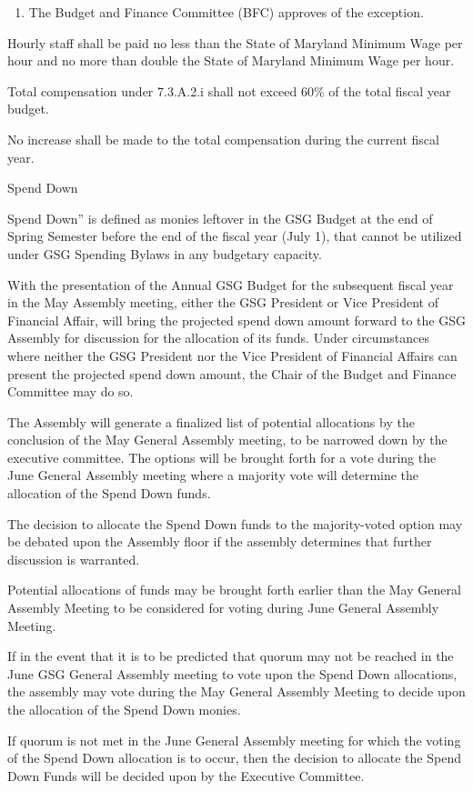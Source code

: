 \begin{bylaws-number}
\begin{bylaws-number}
\begin{enumerate}[i]
      \item The Budget and Finance Committee (BFC) approves of the exception.
    \end{enumerate}
    \item Hourly staff shall be paid no less than the State of Maryland Minimum Wage per hour and no more than double the State of Maryland Minimum Wage per hour.
    \item Total compensation under 7.3.A.2.i shall not exceed 60\% of the total fiscal year budget.
    \item No increase shall be made to the total compensation during the current fiscal year.
  \end{bylaws-number}
 
  \item Spend Down
  \begin{bylaws-number}
    \item Spend Down” is defined as monies leftover in the GSG Budget at the end of Spring Semester before the end of the fiscal year (July 1), that cannot be utilized under GSG Spending Bylaws in any budgetary capacity.
    \item With the presentation of the Annual GSG Budget for the subsequent fiscal year in the May Assembly meeting, either the GSG President or Vice President of Financial Affair, will bring the projected spend down amount forward to the GSG Assembly for discussion for the allocation of its funds. Under circumstances where neither the GSG President nor the Vice President of Financial Affairs can present the projected spend down amount, the Chair of the Budget and Finance Committee may do so.
    \item The Assembly will generate a finalized list of potential allocations by the conclusion of the May General Assembly meeting, to be narrowed down by the executive committee. The options will be brought forth for a vote during the June General Assembly meeting where a majority vote will determine the allocation of the Spend Down funds.
    \item The decision to allocate the Spend Down funds to the majority-voted option may be debated upon the Assembly floor if the assembly determines that further discussion is warranted.
    \item Potential allocations of funds may be brought forth earlier than the May General Assembly Meeting to be considered for voting during June General Assembly Meeting.
    \item If in the event that it is to be predicted that quorum may not be reached in the June GSG General Assembly meeting to vote upon the Spend Down allocations, the assembly may vote during the May General Assembly Meeting to decide upon the allocation of the Spend Down monies.
    \item If quorum is not met in the June General Assembly meeting for which the voting of the Spend Down allocation is to occur, then the decision to allocate the Spend Down Funds will be decided upon by the Executive Committee.
  \end{bylaws-number}
\end{bylaws-number}

